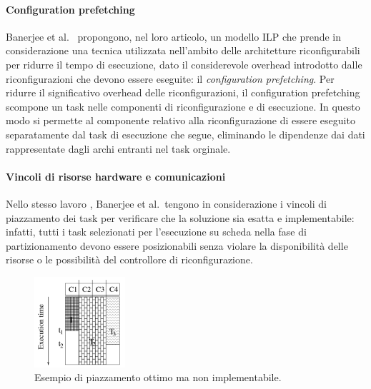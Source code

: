 \paragraph{Configuration prefetching}
Banerjee et al.~\cite{BanerjeePhysicalConstraints} propongono, nel loro 
articolo, un modello ILP che prende in considerazione una tecnica utilizzata 
nell'ambito delle architetture riconfigurabili per ridurre il tempo di 
esecuzione, dato il considerevole overhead introdotto dalle riconfigurazioni 
che devono essere eseguite: il \emph{configuration prefetching}.
Per ridurre il significativo overhead delle riconfigurazioni, il configuration 
prefetching scompone un task nelle componenti di riconfigurazione e di 
esecuzione. In questo modo si permette al componente relativo alla 
riconfigurazione di essere eseguito separatamente dal task di esecuzione che 
segue, eliminando le dipendenze dai dati rappresentate dagli archi entranti nel 
task orginale.

\paragraph{Vincoli di risorse hardware e comunicazioni}
Nello stesso lavoro \cite{BanerjeePhysicalConstraints}, Banerjee et al.~tengono 
in considerazione i vincoli di piazzamento dei task per verificare che la 
soluzione sia esatta e implementabile: infatti, tutti i task selezionati per 
l'esecuzione su scheda nella fase di partizionamento devono essere 
posizionabili senza violare la disponibilità delle risorse o le possibilità del 
controllore di riconfigurazione.

\begin{figure}[!htb]
 \begin{center}
  \includegraphics[width=0.3\textwidth]
{./capitoli/figure/cap2/InfeasiblePlacement.pdf}
\caption[Piazzamento ottimo non implementabile]{Esempio di piazzamento ottimo 
ma non implementabile\footnotemark.}
\label{fig:infeasiblePlacement}
 \end{center}
\end{figure}


